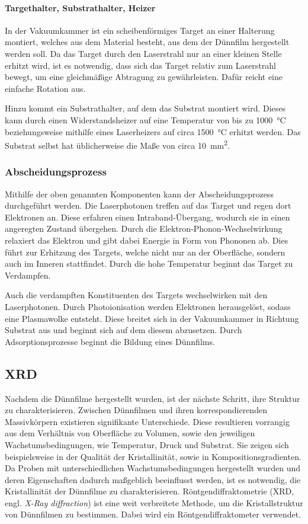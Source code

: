 \paragraph{Targethalter, Substrathalter, Heizer}
In der Vakuumkammer ist ein scheibenförmiges Target an einer Halterung montiert, welches aus dem Material besteht, aus
dem der Dünnfilm hergestellt werden soll.
Da das Target durch den Laserstrahl nur an einer kleinen Stelle erhitzt wird, ist es notwendig,
dass sich das Target relativ zum Laserstrahl bewegt, um eine gleichmäßige Abtragung zu gewährleisten.
Dafür reicht eine einfache Rotation aus.

Hinzu kommt ein Substrathalter, auf dem das Substrat montiert wird.
Dieses kann durch einen Widerstandsheizer auf eine Temperatur von bis zu \qty{1000}{\celsius} beziehungsweise
mithilfe eines Laserheizers auf circa \qty{1500}{\celsius} erhitzt werden.
Das Substrat selbst hat üblicherweise die Maße von circa \qty{10}{\milli\meter\squared}.\autocite[2299]{pld}

\subsubsection{Abscheidungsprozess}
Mithilfe der oben genannten Komponenten kann der Abscheidungsprozess durchgeführt werden.
Die Laserphotonen treffen auf das Target und regen dort Elektronen an.
Diese erfahren einen Intraband-Übergang, wodurch sie in einen angeregten Zustand übergehen.
Durch die Elektron-Phonon-Wechselwirkung relaxiert das Elektron und gibt dabei Energie in Form von Phononen ab.
Dies führt zur Erhitzung des Targets, welche nicht nur an der Oberfläche, sondern auch im Inneren stattfindet.
Durch die hohe Temperatur beginnt das Target zu Verdampfen.

Auch die verdampften Konstituenten des Targets wechselwirken mit den Laserphotonen.
Durch Photoionisation werden Elektronen herausgelöst, sodass eine Plasmawolke entsteht.
Diese breitet sich in der Vakuumkammer in Richtung Substrat aus und beginnt sich auf dem diesem abzusetzen.
Durch Adsorptionsprozesse beginnt die Bildung eines Dünnfilms.\autocite[2299-2301]{pld}

\subsection{XRD}\label{subsec:xrd}
Nachdem die Dünnfilme hergestellt wurden, ist der nächste Schritt, ihre Struktur zu charakterisieren.
Zwischen Dünnfilmen und ihren korrespondierenden Massivkörpern existieren signifikante Unterschiede.
Diese resultieren vorrangig aus dem Verhältnis von Oberfläche zu Volumen, sowie den jeweiligen
Wachstumsbedingungen, wie Temperatur, Druck und Substrat.
Sie zeigen sich beispielsweise in der Qualität der Kristallinität, sowie in Kompositionsgradienten.
Da Proben mit unterschiedlichen Wachstumsbedingungen hergestellt wurden und deren Eigenschaften dadurch
maßgeblich beeinflusst werden, ist es notwendig, die Kristallinität der Dünnfilme zu charakterisieren.
Röntgendiffraktometrie (XRD, engl. \textit{X-Ray diffraction}) ist eine weit verbreitete Methode, um die
Kristallstruktur von Dünnfilmen zu bestimmen.
Dabei wird ein Röntgendiffraktometer verwendet.


